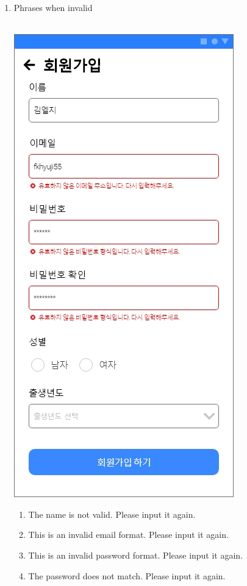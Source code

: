 \documentclass[conference]{IEEEtran}
\begin{document}
\begin{enumerate}
\begin{itemize}
          \begin{enumerate} 
          \item Phrases when invalid \\ \\
            \centerline{\includegraphics[scale=0.28]{assets/회원가입3.jpg}}
          \begin{enumerate}
          \item The name is not valid. Please input it again.
          \item This is an invalid email format. Please input it again.
          \item This is an invalid password format. Please input it again.
          \item The password does not match. Please input it again.

\end{enumerate}
\end{enumerate}
\end{itemize}
\end{enumerate}
\end{document}
